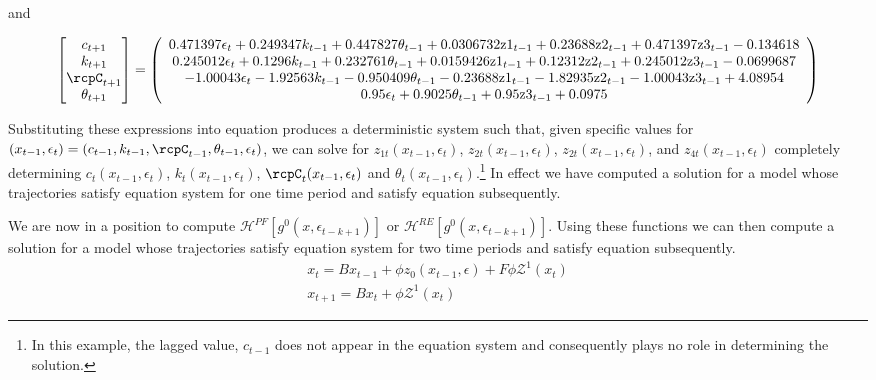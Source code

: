 \documentclass[12pt]{article}
\begin{document}
and 


{\tiny
\begin{gather}
  \begin{bmatrix}
c_{t+1}\\k_{t+1}\\ \rcpC_{t+1}\\\theta_{t+1}
  \end{bmatrix}=%
  \left(
   \begin{array}{c}
 0.471397 \epsilon _t+0.249347 k_{t-1}+0.447827 \theta _{t-1}+0.0306732
   \text{z1}_{t-1}+0.23688 \text{z2}_{t-1}+0.471397 \text{z3}_{t-1}-0.134618 \\
 0.245012 \epsilon_t+0.1296 k_{t-1}+0.232761 \theta _{t-1}+0.0159426
   \text{z1}_{t-1}+0.12312 \text{z2}_{t-1}+0.245012 \text{z3}_{t-1}-0.0699687 \\
 -1.00043 \epsilon _t-1.92563 k_{t-1}-0.950409 \theta _{t-1}-0.23688
   \text{z1}_{t-1}-1.82935 \text{z2}_{t-1}-1.00043 \text{z3}_{t-1}+4.08954 \\
 0.95 \epsilon _t+0.9025 \theta _{t-1}+0.95 \text{z3}_{t-1}+0.0975 \\
   \end{array}
   \right)
\end{gather}}

Substituting  these expressions into equation  produces
a deterministic system such that, given specific values for 
$(x_{t-1},\epsilon_{t})=(c_{t-1}, k_{t-1},\rcpC_{t-1}, \theta_{t-1}, \epsilon_t)$, we can solve for $z_{1t}(x_{t-1},\epsilon_{t})$, $z_{2t}(x_{t-1},\epsilon_{t})$, $z_{2t}(x_{t-1},\epsilon_{t})$, and $z_{4t}(x_{t-1},\epsilon_{t})$  completely determining
$c_{t}(x_{t-1},\epsilon_{t})$, $k_{t}(x_{t-1},\epsilon_{t})$, $\rcpC_{t}(x_{t-1},\epsilon_{t})$  and $\theta_{t}(x_{t-1},\epsilon_{t})$.\footnote{In this example, the lagged value,  $c_{t-1}$ does not appear in the equation system and consequently plays no role in determining the solution.}  In effect we have 
computed a solution for a model whose trajectories satisfy equation system 
for one time period and satisfy equation  subsequently.

We are now in a position to compute
$\mathcal{H}^{PF}[g^{0}(x,\epsilon_{t-k+1})]$ or
$\mathcal{H}^{RE}[g^{0}(x,\epsilon_{t-k+1})]$.
Using these functions we can then compute a solution for a model whose trajectories satisfy equation system 
for two time periods and satisfy equation  subsequently.
\begin{gather}
  \label{eq:1}
  x_t=B x_{t-1} + \phi z_0(x_{t-1},\epsilon) + F \phi \mathcal{Z}^1(x_t)\\
  x_{t+1}=B x_{t} + \phi \mathcal{Z}^1(x_t)
\end{gather}
\end{document}
